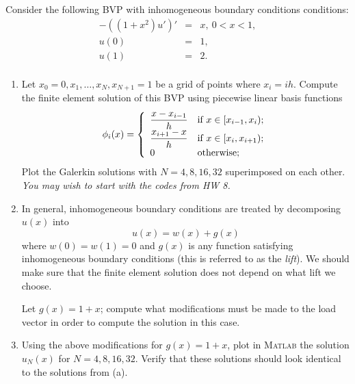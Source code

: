 Consider the following BVP with inhomogeneous boundary conditions conditions:
\begin{eqnarray*}
 -((1+x^2)u')'&=&x, \ 0<x<1, \\
u(0)&=&1, \\
u(1)&=&2. \\
\end{eqnarray*}

\begin{enumerate}
\item Let $x_0 = 0, x_1, \ldots, x_N, x_{N+1} = 1$ be a grid of points where $x_i = ih$.  Compute the finite element solution of this BVP using piecewise linear basis functions
\[
\phi_i(x) = \left\{
\begin{array}{ll}
\displaystyle{{x-x_{i-1}\over h}} & \mbox{if }x\in [x_{i-1}, x_i);\\
\displaystyle{{x_{i+1}-x\over h}} & \mbox{if }x\in [x_i, x_{i+1});\\
0 & \mbox{otherwise};
\end{array}\right.
\]
Plot the Galerkin solutions with $N=4, 8, 16, 32$ superimposed on each other.  \emph{You may wish to start with the codes from HW 8.}
\item In general, inhomogeneous boundary conditions are treated by decomposing $u(x)$ into 
\[
u(x) = w(x) + g(x)
\]
where $w(0) = w(1) = 0$ and $g(x)$ is any function satisfying inhomogeneous boundary conditions (this is referred to as the \emph{lift}).  We should make sure that the finite element solution does not depend on what lift we choose.  

Let $g(x) = 1 + x$; compute what modifications must be made to the load vector in order to compute the solution in this case.  
\item Using the above modifications for $g(x) = 1+x$, plot in \textsc{Matlab} the solution $u_N(x)$ for $N = 4,8,16,32$.  Verify that these solutions should look identical to the solutions from (a).  
\end{enumerate}



